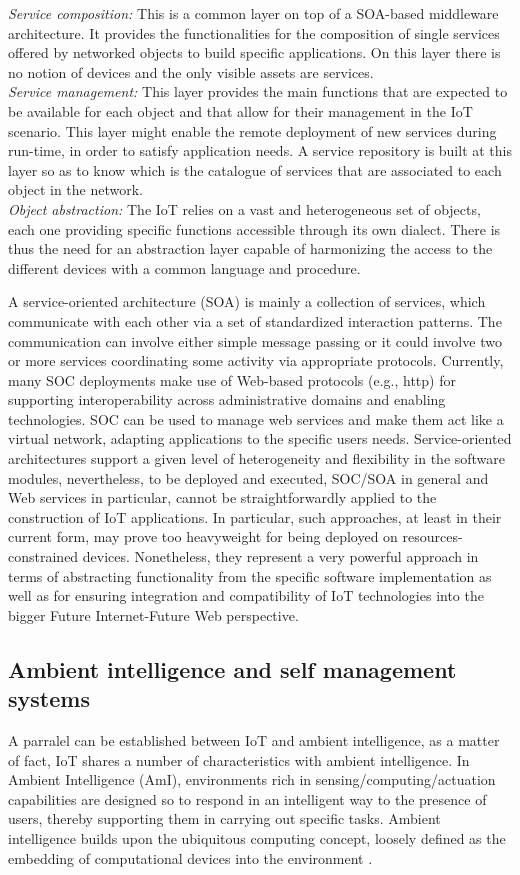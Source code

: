 \documentclass[10pt, twocolumn]{article}
\begin{document}
\emph{Service composition: }This is a common layer on top of a SOA-based middleware architecture. It provides the functionalities for the composition of single services offered by networked objects to build specific applications. On this layer there is no notion of devices and the only visible assets are services.\\

\emph{Service management: }This layer provides the main functions that are expected to be available for each object and that allow for their management in the IoT scenario. This layer might enable the remote deployment of new services during run-time, in order to satisfy application needs. A service repository is built at this layer so as to know which is the catalogue of services that are associated to each object in the network.\\

\emph{Object abstraction: } The IoT relies on a vast and heterogeneous set of objects, each one providing specific functions accessible through its own dialect. There is thus the need for an abstraction layer capable of harmonizing the access to the different devices with a common language and procedure.

A service-oriented architecture (SOA) is mainly a collection of services, which communicate with each other via a set of standardized interaction patterns. The communication can involve either simple message passing or it could involve two or more services coordinating some activity via appropriate protocols. Currently, many SOC deployments make use of Web-based protocols (e.g., http) for supporting interoperability across administrative domains and enabling technologies. SOC can be used to manage web services and make them act like a virtual network, adapting applications to the specific users needs.
Service-oriented architectures support a given level of heterogeneity and flexibility in the software modules, nevertheless, to be deployed and executed, SOC/SOA in general and Web services in particular, cannot be straightforwardly applied to the construction of IoT applications. In particular, such approaches, at least in their current form, may prove too heavyweight for being deployed on resources-constrained devices.
Nonetheless, they represent a very powerful approach in terms of abstracting functionality from the specific  software implementation as well as for ensuring integration and compatibility of IoT technologies into the bigger Future Internet-Future Web perspective\cite{ref2}.
\subsection{Ambient intelligence and self management systems} 
A parralel can be established between IoT and ambient intelligence, as a matter of fact, IoT shares a number of characteristics with ambient intelligence. In Ambient Intelligence (AmI), environments rich in sensing/computing/actuation capabilities are designed so to respond in an intelligent way to the presence of users, thereby supporting them in carrying out specific tasks. Ambient intelligence builds upon the ubiquitous computing concept, loosely defined as the embedding of computational devices into the environment \cite{ref9}.
\end{document}
